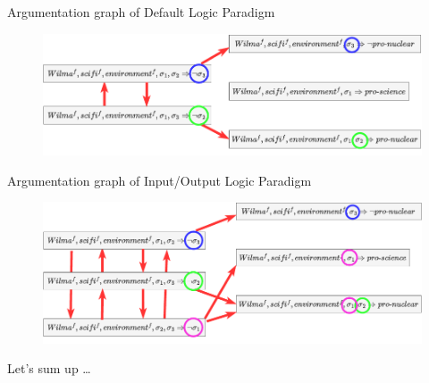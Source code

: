 \documentclass[aspectratio=169]{beamer}
\begin{document}
\begin{frame}{Argumentation graph of Default Logic Paradigm}
    \begin{figure}
		\centering
		\includegraphics[scale=0.9]{pic/attack graph.pdf}
	\end{figure}
\end{frame}


\begin{frame}{Argumentation graph of Input/Output Logic Paradigm}
    \begin{figure}
		\centering
		\includegraphics[scale=0.9]{pic/attack graph2.pdf}
	\end{figure}
\end{frame}

\begin{frame}[label={sec:orgd9716e2},standout]{}
Let's sum up \ldots{}
\end{frame}
\end{document}
